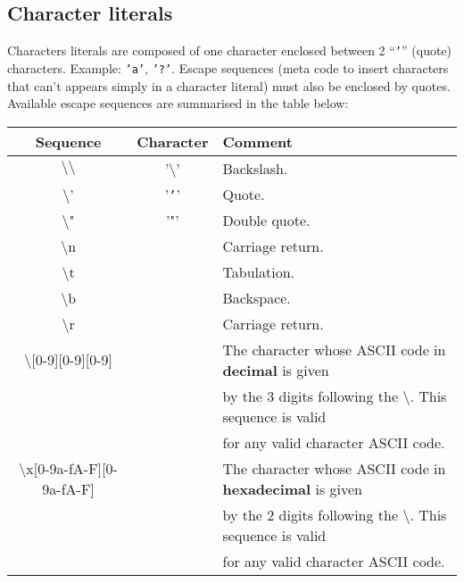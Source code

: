 


\subsection{Character literals}
\label{character literals}
\label{hexadecimal}
Characters literals are composed of one character enclosed between 2 ``{\tt '}''
(quote) characters. Example: {\tt 'a'}, {\tt '?'}.
Escape sequences (meta code to insert characters that can't appears
simply in a character literal) must also be enclosed by
quotes. Available escape sequences are summarised in the table below:

\medskip
\noindent
\begin{tabular}{|c|c|l|}
  \hline
  Sequence & Character & Comment \\
  \hline
  $\setminus\setminus$ & '$\setminus$' & Backslash. \\
  \hline
  $\setminus$'         & '{\tt '}'  & Quote. \\
  \hline
  $\setminus$"         & '"'        & Double quote. \\
  \hline
  $\setminus$n         &            & Carriage return. \\
  \hline
  $\setminus$t         &            & Tabulation. \\
  \hline
  $\setminus$b         &            & Backspace. \\
  \hline
  $\setminus$r         &            & Carriage return. \\
  \hline
  $\setminus$[0-9][0-9][0-9] & & The character whose ASCII code in
                                {\bf decimal} is given \\
               &                  & by the 3 digits following the
                                  $\setminus$. This sequence is valid \\
               &                  & for any valid character
      ASCII code.\\
  \hline
  $\setminus$x[0-9a-fA-F][0-9a-fA-F] & & The character whose ASCII code in
                                {\bf hexadecimal} is given \\
               &                  & by the 2 digits following the
                                  $\setminus$. This sequence is valid \\
               &                  & for any valid character
      ASCII code.\\
  \hline
\end{tabular}



